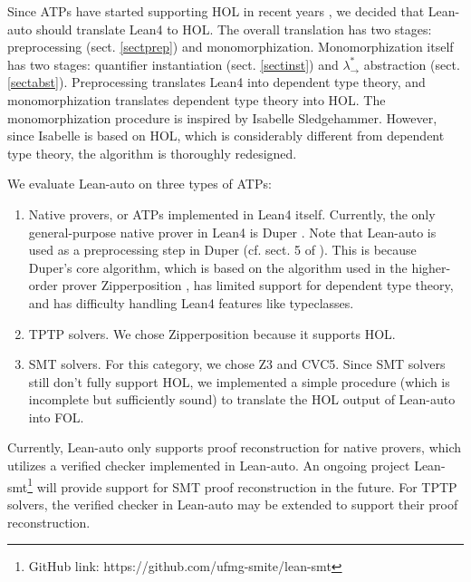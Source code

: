   Since ATPs have started supporting HOL in recent years \cite{HOVampire}\cite{ZipperpositionMakeWork}\cite{HOEProver},
  we decided that Lean-auto should translate Lean4 to HOL. The overall translation has
  two stages: preprocessing (sect. \ref{sectprep}) and monomorphization.
  Monomorphization itself has two stages: quantifier instantiation (sect. \ref{sectinst})
  and $\lambda_\to^*$ abstraction (sect. \ref{sectabst}). Preprocessing translates Lean4
  into dependent type theory, and monomorphization translates dependent type theory
  into HOL. The monomorphization procedure is inspired by Isabelle Sledgehammer.
  However, since Isabelle is based on HOL, which is considerably different from
  dependent type theory, the algorithm is thoroughly redesigned.
  
  We evaluate Lean-auto on three types of ATPs:
  \begin{enumerate}
    \item Native provers, or ATPs implemented in Lean4 itself. Currently, the only general-purpose
      native prover in Lean4 is Duper \cite{DuperPaper}. Note that Lean-auto is
      used as a preprocessing step in Duper (cf. sect. 5 of \cite{DuperPaper}).
      This is because Duper's core algorithm, which is based on the algorithm used
      in the higher-order prover Zipperposition \cite{ZipperpositionMakeWork}, has limited support for dependent
      type theory, and has difficulty handling Lean4 features like typeclasses.
    \item TPTP solvers. We chose Zipperposition because it supports HOL.
    \item SMT solvers. For this category, we chose Z3 and CVC5. Since SMT solvers
      still don't fully support HOL, we implemented a simple procedure
      (which is incomplete but sufficiently sound) to translate the HOL output of Lean-auto into FOL.
  \end{enumerate}

  Currently, Lean-auto only supports proof reconstruction for native provers,
  which utilizes a verified checker implemented in Lean-auto. An
  ongoing project Lean-smt\footnote{GitHub link: https://github.com/ufmg-smite/lean-smt}
  will provide support for SMT proof reconstruction in the future. For TPTP solvers,
  the verified checker in Lean-auto may be extended to support their proof reconstruction.
